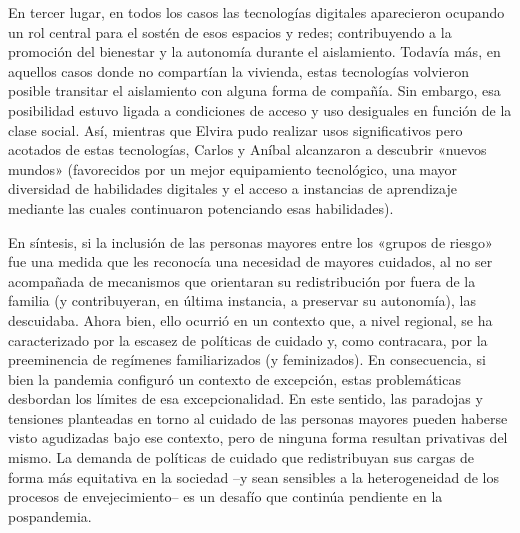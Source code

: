 \begin{refsection}
En tercer lugar, en todos los casos las tecnologías digitales aparecieron ocupando un rol central para el sostén de esos espacios y redes; contribuyendo a la promoción del bienestar y la autonomía durante el aislamiento. Todavía más, en aquellos casos donde no compartían la vivienda, estas tecnologías volvieron posible transitar el aislamiento con alguna forma de compañía. Sin embargo, esa posibilidad estuvo ligada a condiciones de acceso y uso desiguales en función de la clase social. Así, mientras que Elvira pudo realizar usos significativos pero acotados de estas tecnologías, Carlos y Aníbal alcanzaron a descubrir «nuevos mundos» (favorecidos por un mejor equipamiento tecnológico, una mayor diversidad de habilidades digitales y el acceso a instancias de aprendizaje mediante las cuales continuaron potenciando esas habilidades).

En síntesis, si la inclusión de las personas mayores entre los «grupos de riesgo» fue una medida que les reconocía una necesidad de mayores cuidados, al no ser acompañada de mecanismos que orientaran su redistribución por fuera de la familia (y contribuyeran, en última instancia, a preservar su autonomía), las descuidaba. Ahora bien, ello ocurrió en un contexto que, a nivel regional, se ha caracterizado por la escasez de políticas de cuidado y, como contracara, por la preeminencia de regímenes familiarizados (y feminizados). En consecuencia, si bien la pandemia configuró un contexto de excepción, estas problemáticas desbordan los límites de esa excepcionalidad. En este sentido, las paradojas y tensiones planteadas en torno al cuidado de las personas mayores pueden haberse visto agudizadas bajo ese contexto, pero de ninguna forma resultan privativas del mismo. La demanda de políticas de cuidado que redistribuyan sus cargas de forma más equitativa en la sociedad –y sean sensibles a la heterogeneidad de los procesos de envejecimiento– es un desafío que continúa pendiente en la pospandemia.


\section*{\refname}
\printbibliography[heading=none]
\end{refsection}

